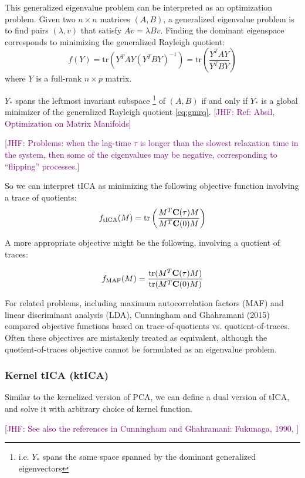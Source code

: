 \documentclass[aps,prl,preprint,nofootinbib,superscriptaddress,linenumbers]{revtex4-1}
\newcommand{\bfm}[1]{{\bf #1}}
\newcommand{\jhfcomment}[1]{\textcolor{purple}{[JHF: #1]}} 	%
\begin{document}
This generalized eigenvalue problem can be interpreted as an optimization problem. Given two $n\times n$ matrices $(A,B)$, a generalized eigenvalue problem is to find pairs $(\lambda,v)$ that satisfy $A v = \lambda B v$. Finding the dominant eigenspace corresponds to minimizing the generalized Rayleigh quotient:
\begin{equation} \label{eq:gmrq}
f(Y) = \text{tr}(Y^TAY(Y^TBY)^{-1}) = \text{tr}\left(\frac{Y^TAY}{Y^TBY}\right) 
\end{equation}
where $Y$ is a full-rank $n \times p$ matrix.

$Y_*$ spans the leftmost invariant subspace 
	\footnote{i.e. $Y_*$ spans the same space spanned by the dominant generalized eigenvectors}
of $(A,B)$ if and only if
$Y_*$ is a global minimizer of the generalized Rayleigh quotient \ref{eq:gmrq}. \jhfcomment{Ref: Absil, Optimization on Matrix Manifolds}


\jhfcomment{Problems: when the lag-time $\tau$ is longer than the slowest relaxation time in the system, then some of the eigenvalues may be negative, corresponding to ``flipping'' processes.}

So we can interpret tICA as minimizing the following objective function involving a trace of quotients:
$$ f_{\text{tICA}}(M) = \text{tr}\left(\frac{M^T \bfm{C}(\tau) M}{M^T \bfm{C}(0) M}\right) $$

A more appropriate objective might be the following, involving a quotient of traces:

$$ f_{\text{MAF}}(M) = \frac{\text{tr}(M^T \bfm{C}(\tau) M)}{\text{tr}(M^T \bfm{C}(0) M)}$$

For related problems, including maximum autocorrelation factors (MAF) and linear discriminant analysis (LDA), Cunningham and Ghahramani (2015) compared objective functions based on trace-of-quotients vs. quotient-of-traces. Often these objectives are mistakenly treated as equivalent, although the quotient-of-traces objective cannot be formulated as an eigenvalue problem.

\subsubsection{Kernel tICA (ktICA)}
Similar to the kernelized version of PCA, we can define a dual version of tICA, and solve it with arbitrary choice of kernel function.

\jhfcomment{See also the references in Cunningham and Ghahramani: Fukunaga, 1990, }
\end{document}
